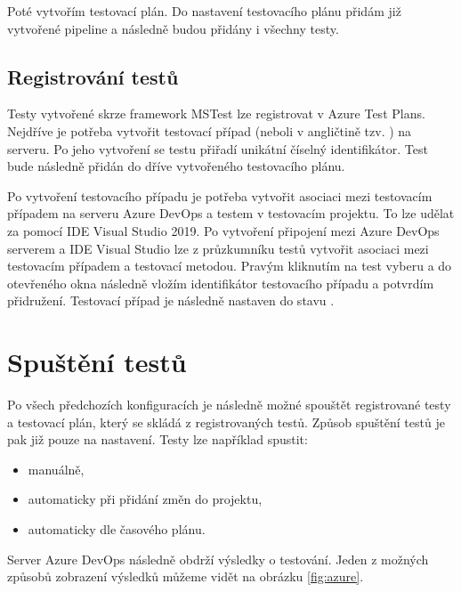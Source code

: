 Poté vytvořím testovací plán. Do nastavení testovacího plánu přidám již vytvořené pipeline a následně budou přidány i všechny testy. 

\subsection{Registrování testů}
Testy vytvořené skrze framework MSTest lze registrovat v Azure Test Plans. Nejdříve je potřeba vytvořit testovací případ (neboli v angličtině tzv. ) na serveru. Po jeho vytvoření se testu přiřadí unikátní číselný identifikátor. Test bude následně přidán do dříve vytvořeného testovacího plánu.

Po vytvoření testovacího případu je potřeba vytvořit asociaci mezi testovacím případem na serveru Azure DevOps a testem v testovacím projektu. To lze udělat za pomocí IDE Visual Studio 2019. Po vytvoření připojení mezi Azure DevOps serverem a IDE Visual Studio lze z průzkumníku testů vytvořit asociaci mezi testovacím případem a testovací metodou. Pravým kliknutím na test vyberu  a do otevřeného okna následně vložím identifikátor testovacího případu a potvrdím přidružení. Testovací případ je následně nastaven do stavu .

\section{Spuštění testů}
Po všech předchozích konfiguracích je následně možné spouštět registrované testy a testovací plán, který se skládá z registrovaných testů. Způsob spuštění testů je pak již pouze na nastavení. Testy lze například spustit:

\begin{itemize}
    \item manuálně,
    \item automaticky při přidání změn do projektu,
    \item automaticky dle časového plánu.
\end{itemize}

Server Azure DevOps následně obdrží výsledky o testování. Jeden z možných způsobů zobrazení výsledků můžeme vidět na obrázku \ref{fig:azure}.

